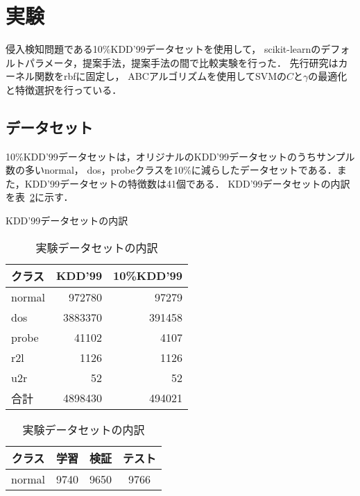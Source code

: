 \section{実験}
侵入検知問題である10\%KDD'99データセットを使用して，
scikit-learnのデフォルトパラメータ，提案手法，提案手法の間で比較実験を行った．
先行研究はカーネル関数をrbfに固定し，
ABCアルゴリズムを使用してSVMの$C$と$\gamma$の最適化と特徴選択を行っている\cite{origin}．
\subsection{データセット}
10\%KDD'99データセットは，オリジナルのKDD'99データセットのうちサンプル数の多いnormal，
dos，probeクラスを10\%に減らしたデータセットである．また，KDD'99データセットの特徴数は41個である．
KDD'99データセットの内訳を表~\ref{kdd99}に示す．
\begin{table}[tb]
    \centering
    \begin{minipage}{0.45\textwidth}  %
        \centering
        \caption{KDD'99データセットの内訳}  %
        \begin{tabular}{|l|r|r|}  %
          \hline  %
          クラス & KDD'99 & 10\%KDD'99 \\  %
          \hline  %
          normal & 972780 & 97279 \\  %
          \hline  %
          dos & 3883370 & 391458 \\  %
          \hline  %
          probe & 41102 & 4107 \\  %
          \hline  %
          r2l & 1126 & 1126 \\  %
          \hline  %
          u2r & 52 & 52 \\  %
          \hline  %
          合計 & 4898430 & 494021 \\  %
          \hline  %
        \end{tabular}
        \label{kdd99}  %
    \end{minipage}
    \begin{minipage}{0.45\textwidth}  %
        \centering
        \caption{実験データセットの内訳}  %
        \begin{tabular}{|c|c|c|c|}  %
          \hline  %
          クラス & 学習 & 検証 & テスト \\  %
          \hline  %
          normal & 9740 & 9650 & 9766 \\  %

\end{tabular}
\end{minipage}
\end{table}
